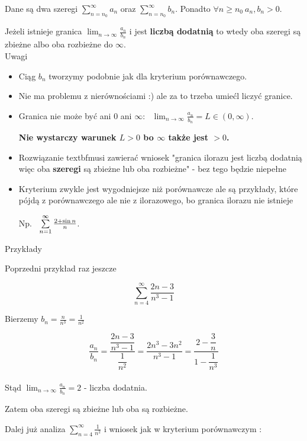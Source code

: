 Dane są dwa szeregi $ \sum\limits_{n = n_0}^{\infty} a_n $ oraz $ \sum\limits_{n = n_0}^{\infty} b_n $.
Ponadto $ \forall n \geq n_0 \ a_n, b_n > 0 $.

Jeżeli istnieje granica $ \lim_{n \to \infty} \frac{a_n}{b_n} $ i jest \textbf{liczbą dodatnią} to wtedy oba
szeregi są zbieżne albo oba rozbieżne do $\infty$. \\

Uwagi

\begin{itemize}
    \item Ciąg $b_n$ tworzymy podobnie jak dla kryterium porównawczego.
    \item Nie ma problemu z nierównościami :) ale za to trzeba umiećl liczyć granice.
    \item Granica nie może być ani 0 ani $\infty$: \ $ \lim_{n \to \infty} \frac{a_n}{b_n} = L \in (0, \infty) $.
    
    \textbf{Nie wystarczy warunek $L > 0$ bo $\infty$ także jest $ > 0$.}
    \item Rozwiązanie textbf{musi zawierać wniosek} "granica ilorazu jest liczbą dodatnią więc oba
    \textbf{szeregi} są zbieżne lub oba rozbieżne" - bez tego będzie niepełne
    
    \item Kryterium zwykle jest wygodniejsze niż porównawcze ale są przykłady, które pójdą z porównawczego ale nie z
    ilorazowego, bo granica ilorazu nie istnieje
    
    Np. \ $ \sum\limits_{n = 1}^{\infty} \frac{2 + \sin n}{n} $.
\end{itemize}

Przykłady

Poprzedni przykład raz jeszcze 

$$ \sum\limits_{n = 4}^{\infty} \frac{2n - 3}{n^3 - 1} $$

Bierzemy $ b_n = \frac{n}{n^3} = \frac{1}{n^2} $

$$ \dfrac{a_n}{b_n} = \dfrac{\dfrac{2n - 3}{n^3 - 1}}{\dfrac{1}{n^2}} = \dfrac{2n^3 - 3n^2}{n^3 - 1}
= \dfrac{2 - \dfrac{3}{n}}{1 - \dfrac{1}{n^3}} $$ \\

Stąd $ \lim_{n \to \infty} \frac{a_n}{b_n} = 2 $ - liczba dodatnia.

Zatem oba szeregi są zbieżne lub oba są rozbieżne.

Dalej już analiza $ \sum\limits_{n = 4}^{\infty} \frac{1}{n^2} $ i wniosek jak w kryterium porównawczym :

